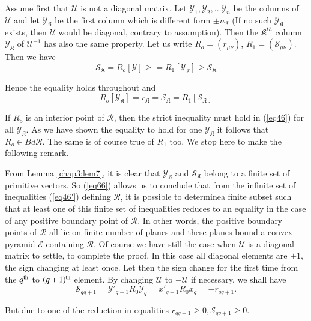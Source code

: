  Assume first that $ \mathcal{U} $ is not a diagonal matrix. Let $
 \mathscr{Y}_1, \mathscr{Y}_2, \ldots \mathscr{Y}_n $  be the columns
 of $ \mathcal{U} $ and let $ \mathscr{Y}_\mathfrak{K} $ be the first
 column which is different form $ \pm n_\mathfrak{K} $ (If no such $
 \mathscr{Y}_\mathfrak{K} $ exists, then $ \mathcal{U} $ would  be
 diagonal, contrary to assumption). Then the $ \mathfrak{K}^{th} $
 column $ \mathscr{Y}_\mathfrak{K} $ of $ \mathcal{U}^{-1} $ has also
 the same property. Let us write $ R_o = ( r_{\mu \nu })$, $R_1 = (
 \mathscr{S}_{\mu \nu }) $. Then we have  
 $$
  \mathscr{S}_\mathfrak{K} = R_o [ \mathscr{Y} ] \ge = R_1 [
    \mathscr{Y}_\mathfrak{K} ] \ge \mathscr{S}_\mathfrak{K} 
 $$
 
Hence the equality holds throughout and 
$$
R_o [ \mathscr{Y}_\mathfrak{K} ] = r_\mathfrak{K} =
\mathscr{S}_\mathfrak{K} = R_1 [ \mathscr{S}_\mathfrak{K} ] 
$$

If $ R_o $ is an interior point of $ \mathscr{R} $, then the strict
inequality must hold in (\ref{eq46}) for all $ \mathscr{Y}_\mathfrak{K} $. As
we have shown the equality to hold for one $ \mathscr{Y}_\mathfrak{K} $
it follows that $R_o \in Bd \mathscr{R}$. The same is of course true of
$R_1 $ too. We stop here to make the following remark.   

From Lemma \ref{chap3:lem7}, it is clear that $
\mathscr{Y}_\mathfrak{K} $  and $ 
\mathcal{S}_\mathfrak{K} $ belong to a finite set of primitive
vectors. So (\ref{eq66}) allows us to conclude that from the  infinite set
of inequalities (\ref{eq46'}) defining $ \mathscr{R} $, it is possible to
determine\pageoriginale a finite subset such that at least one of this
finite set of 
inequalities reduces to an equality in the case of any positive
boundary point of $ \mathscr{R} $. In other words, the positive
boundary points of $ \mathscr{R} $ all lie on finite number of planes
and these planes bound a convex pyramid $ \mathscr{E} $ containing $
\mathscr{R} $. Of course we have still the case when $\mathcal{U}$ is
a diagonal matrix to settle, to complete the proof. In this case all
diagonal elements are $\pm 1$, the sign changing at least once. Let
then the sign change for the first time from the $q^{\rm th}$ to $( q
+ 1 )^{\rm th}$ element. By changing $\mathcal{U}$ to $-\mathcal{U} $
if necessary, we shall have    
$$
 \mathscr{S}_{q q+1} = \mathscr{Y}'_{q + 1} R_0   \mathscr{Y}_q   =
 x'_{ q + 1} R_0    x_q = - r_{q q+1 }. 
 $$ 

But due to one of the reduction in equalities $ r_{q q+1} \ge 0,
\mathscr{S}_{q q+1} \ge 0 $. 

